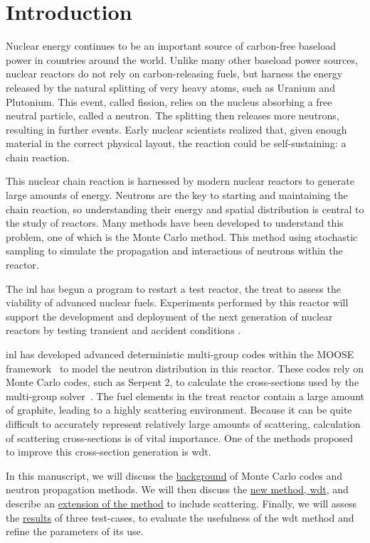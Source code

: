 
\chapter{Introduction}
\label{chap:intro}

Nuclear energy continues to be an important source of carbon-free
baseload power in countries around the world. Unlike many other
baseload power sources, nuclear reactors do not rely on
carbon-releasing fuels, but harness the energy released by the
natural splitting of very heavy atoms, such as Uranium and
Plutonium. This event, called fission, relies on the nucleus absorbing
a free neutral particle, called a neutron. The splitting then releases
more neutrons, resulting in further events. Early nuclear scientists
realized that, given enough material in the correct physical layout,
the reaction could be self-sustaining: a chain reaction.

This nuclear chain reaction is harnessed by modern nuclear reactors
to generate large amounts of energy. Neutrons are the key to starting
and maintaining the chain reaction, so understanding their energy and
spatial distribution is central to the study of reactors. Many methods
have been developed to understand this problem, one of which is the
Monte Carlo method. This method using stochastic sampling to simulate
the propagation and interactions of neutrons within the reactor.

The \gls{inl} has begun a program to restart a test reactor, the
\gls{treat} to assess the viability of advanced nuclear
fuels. Experiments performed by this reactor will
support the development and deployment of the next generation of
nuclear reactors by testing transient and accident conditions \cite{webtreat}.

\gls{inl} has developed advanced deterministic multi-group codes
within the MOOSE framework~\cite{gaston2009} to model the neutron
distribution in this reactor. These codes rely on Monte Carlo codes,
such as Serpent 2, 
to calculate the cross-sections used by the
multi-group solver~\cite{ortensi2016}. The fuel elements in the \gls{treat} reactor
contain a large amount of graphite, leading to a highly scattering
environment. Because it can be quite difficult to accurately represent
relatively large amounts of scattering, calculation of scattering cross-sections is of
vital importance. One of the methods proposed to improve this
cross-section generation is \gls{wdt}.

In this manuscript, we will discuss the
\hyperref[chap:background]{background} of Monte Carlo codes and
neutron propagation methods. We will then discuss the
\hyperref[sec:wdt]{new method, \gls{wdt}}, and describe an
\hyperref[sec:wdt_scattering]{extension of the method} to include
scattering. Finally, we will assess the
\hyperref[chap:results]{results} of three test-cases, to evaluate the
usefulness of the \gls{wdt} method and refine the parameters of its
use.



